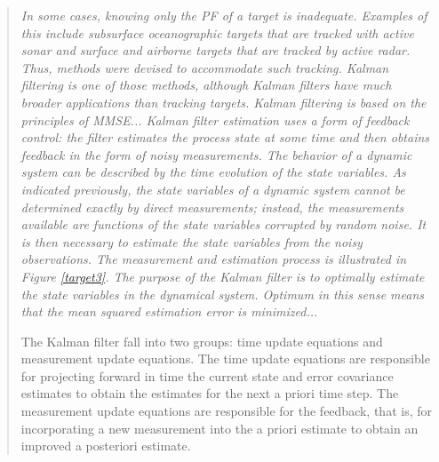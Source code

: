 \documentclass[english,purist]{ist-report}
\begin{document}
\begin{quote} \itshape
In some cases, knowing only the PF of a target is inadequate. Examples of this include subsurface oceanographic targets that are tracked with active sonar and surface and airborne targets that are tracked by active radar. Thus, methods were devised to accommodate such tracking. Kalman filtering is one of those methods, although Kalman filters have much broader applications than tracking targets.
Kalman filtering is based on the principles of MMSE...
 Kalman filter estimation uses a form of feedback control: the filter estimates the process state at some time and then obtains feedback in the form of noisy measurements. The behavior of a dynamic system can be described by the time evolution of the state variables. As indicated previously, the state variables of a dynamic system cannot be determined exactly by direct measurements; instead, the measurements available are functions of the state variables corrupted by random noise. It is then necessary to estimate the state variables from the noisy observations. The measurement and estimation process is illustrated in Figure \ref{target3}. The purpose of the Kalman filter is to optimally estimate the state variables in the dynamical system. Optimum in this sense means that the mean squared estimation error is minimized...

 The Kalman filter fall into two groups: time update equations and measurement update equations. The time update equations are responsible for projecting forward in time the current state and error covariance estimates to obtain the estimates for the next a priori time step. The measurement update equations are responsible for the feedback, that is, for incorporating a new measurement into the a priori estimate to obtain an improved a posteriori estimate. \cite{poiseltarget}\end{quote}








\pagebreak
\nocite{*}
\printbibliography
\end{document}
